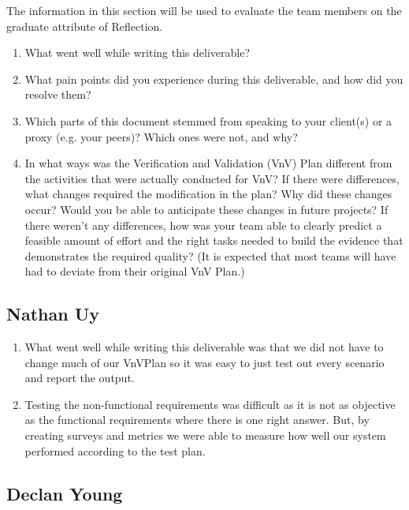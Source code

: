 \documentclass[12pt, titlepage]{article}
\begin{document}
The information in this section will be used to evaluate the team members on the
graduate attribute of Reflection.



\begin{enumerate}
  \item What went well while writing this deliverable? 
  \item What pain points did you experience during this deliverable, and how
    did you resolve them?
  \item Which parts of this document stemmed from speaking to your client(s) or
  a proxy (e.g. your peers)? Which ones were not, and why?
  \item In what ways was the Verification and Validation (VnV) Plan different
  from the activities that were actually conducted for VnV?  If there were
  differences, what changes required the modification in the plan?  Why did
  these changes occur?  Would you be able to anticipate these changes in future
  projects?  If there weren't any differences, how was your team able to clearly
  predict a feasible amount of effort and the right tasks needed to build the
  evidence that demonstrates the required quality?  (It is expected that most
  teams will have had to deviate from their original VnV Plan.)
\end{enumerate}

\subsection*{Nathan Uy}

\begin{enumerate}
    \item What went well while writing this deliverable was that we did not have to change much of our VnVPlan so it was easy to just test out every scenario and report the output.
    \item Testing the non-functional requirements was difficult as it is not as objective as the functional requirements where there is one right answer. But, by creating surveys and metrics we were able to measure how well our system performed according to the test plan. 

\end{enumerate}  

\subsection*{Declan Young}
\end{document}
